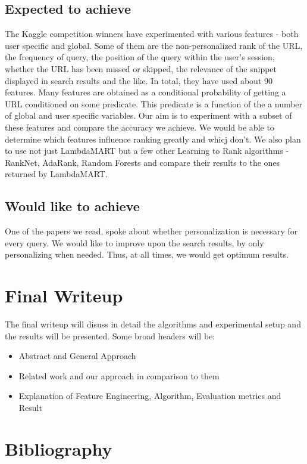 \documentclass[11pt]{article}
\begin{document}
\subsection{Expected to achieve}
The Kaggle competition winners have experimented with various features - both user specific and global. Some of them are the non-personalized rank of the URL, the frequency of query, the position of the query within the user's session, whether the URL has been missed or skipped, the relevance of the snippet displayed in search results and the like. In total, they have used about 90 features. Many features are obtained as a conditional probability of getting a URL conditioned on some predicate. This predicate is a function of the a number of global and user specific variables. \newline
Our aim is to experiment with a subset of these features and compare the accuracy we achieve. We would be able to determine which features influence ranking greatly and whicj don't. We also plan to use not just LambdaMART but a few other Learning to Rank algorithms - RankNet, AdaRank, Random Forests and compare their results to the ones returned by LambdaMART.
\subsection{Would like to achieve}
One of the papers we read, spoke about whether personalization is necessary for every query. We would like to improve upon the search results, by only personalizing when needed. Thus, at all times, we would get optimum results. 
\section{Final Writeup} The final writeup will disuss in detail the algorithms and experimental setup and the results will be presented. Some broad headers will be:\\
\vspace{-5mm} 
\begin{itemize}\setlength{\itemsep}{-5pt}
\item Abstract and General Approach
\item Related work and our approach in comparison to them
\item Explanation of Feature Engineering, Algorithm, Evaluation metrics and Result  
\end{itemize}
\noindent
\section{Bibliography}
\end{document}
